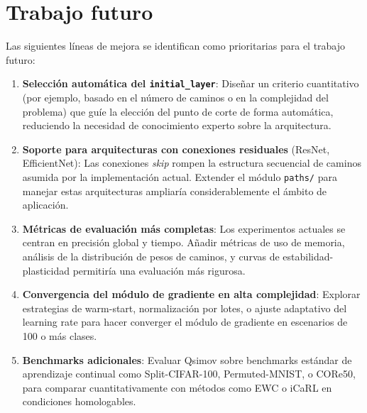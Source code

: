 \section{Trabajo futuro}

Las siguientes líneas de mejora se identifican como prioritarias para el trabajo futuro:

\begin{enumerate}
  \item \textbf{Selección automática del \texttt{initial\_layer}}: Diseñar un criterio cuantitativo
        (por ejemplo, basado en el número de caminos o en la complejidad del problema) que guíe la
        elección del punto de corte de forma automática, reduciendo la necesidad de conocimiento
        experto sobre la arquitectura.

  \item \textbf{Soporte para arquitecturas con conexiones residuales} (ResNet, EfficientNet): Las
        conexiones \textit{skip} rompen la estructura secuencial de caminos asumida por la
        implementación actual. Extender el módulo \texttt{paths/} para manejar estas arquitecturas
        ampliaría considerablemente el ámbito de aplicación.

  \item \textbf{Métricas de evaluación más completas}: Los experimentos actuales se centran en
        precisión global y tiempo. Añadir métricas de uso de memoria, análisis de la distribución
        de pesos de caminos, y curvas de estabilidad-plasticidad permitiría una evaluación más
        rigurosa.

  \item \textbf{Convergencia del módulo de gradiente en alta complejidad}: Explorar estrategias de
        warm-start, normalización por lotes, o ajuste adaptativo del learning rate para hacer
        converger el módulo de gradiente en escenarios de 100 o más clases.

  \item \textbf{Benchmarks adicionales}: Evaluar Qsimov sobre benchmarks estándar de aprendizaje
        continual como Split-CIFAR-100, Permuted-MNIST, o CORe50, para comparar cuantitativamente
        con métodos como EWC o iCaRL en condiciones homologables.
\end{enumerate}
